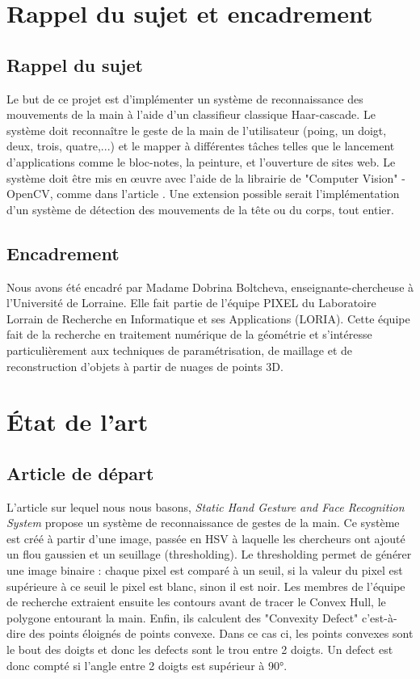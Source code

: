 \documentclass[11pt]{article}
\begin{document}
\newpage

\section{Rappel du sujet et encadrement}
\subsection{Rappel du sujet}

Le but de ce projet est d’implémenter un système de reconnaissance des mouvements de la
main à l’aide d’un classifieur classique Haar-cascade. Le système doit reconnaître le geste de
la main de l’utilisateur (poing, un doigt, deux, trois, quatre,...) et le mapper à différentes tâches
telles que le lancement d’applications comme le bloc-notes, la peinture, et l’ouverture de sites web.
Le système doit être mis en œuvre avec l’aide de la librairie de "Computer Vision" - OpenCV,
comme dans l’article \cite{joshi_static_2021}. Une extension possible serait l’implémentation d’un système de détection
des mouvements de la tête ou du corps, tout entier.

\subsection{Encadrement}
Nous avons été encadré par Madame Dobrina Boltcheva, enseignante-chercheuse à l'Université de Lorraine. Elle fait partie de l'équipe PIXEL du Laboratoire Lorrain de Recherche en Informatique et ses Applications (LORIA). Cette équipe fait de la recherche en traitement numérique de la géométrie et s'intéresse particulièrement aux techniques de paramétrisation, de maillage et de reconstruction d'objets à partir de nuages de points 3D.


\newpage

\section{\'Etat de l'art}
\subsection{Article de départ}
L'article sur lequel nous nous basons, \textit{Static Hand Gesture and Face Recognition System} \cite{joshi_static_2021} propose un système de reconnaissance de gestes de la main. Ce système est créé à partir d'une image, passée en HSV à laquelle les chercheurs ont ajouté un flou gaussien et un seuillage (thresholding). Le thresholding permet de générer une image binaire : chaque pixel est comparé à un seuil, si la valeur du pixel est supérieure à ce seuil le pixel est blanc, sinon il est noir. Les membres de l'équipe de recherche extraient ensuite les contours avant de tracer le Convex Hull, le polygone entourant la main. Enfin, ils calculent des "Convexity Defect" c'est-à-dire des points éloignés de points convexe. Dans ce cas ci, les points convexes sont le bout des doigts et donc les defects sont le trou entre 2 doigts. Un defect est donc compté si l'angle entre 2 doigts est supérieur à 90°.
\end{document}
